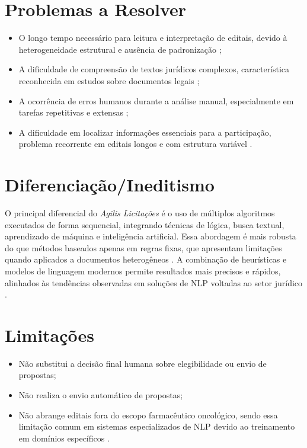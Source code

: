 \section{Problemas a Resolver}

\begin{itemize}
    \item O longo tempo necessário para leitura e interpretação de editais, devido à heterogeneidade estrutural e ausência de padronização \cite{tcu_relatorio_2022};
    \item A dificuldade de compreensão de textos jurídicos complexos, característica reconhecida em estudos sobre documentos legais \cite{chalkidis_legalbert_2020};
    \item A ocorrência de erros humanos durante a análise manual, especialmente em tarefas repetitivas e extensas \cite{kim_rule_based_limitations_2019};
    \item A dificuldade em localizar informações essenciais para a participação, problema recorrente em editais longos e com estrutura variável \cite{tcu_relatorio_2022}.
\end{itemize}


\section{Diferenciação/Ineditismo}

O principal diferencial do \textit{Agilis Licitações} é o uso de múltiplos algoritmos executados de forma sequencial, integrando técnicas de lógica, busca textual, aprendizado de máquina e inteligência artificial. Essa abordagem é mais robusta do que métodos baseados apenas em regras fixas, que apresentam limitações quando aplicados a documentos heterogêneos \cite{kim_rule_based_limitations_2019}. A combinação de heurísticas e modelos de linguagem modernos permite resultados mais precisos e rápidos, alinhados às tendências observadas em soluções de NLP voltadas ao setor jurídico \cite{hendrycks_lexnlp_2020}.


\section{Limitações}

\begin{itemize}
    \item Não substitui a decisão final humana sobre elegibilidade ou envio de propostas;
    \item Não realiza o envio automático de propostas;
    \item Não abrange editais fora do escopo farmacêutico oncológico, sendo essa limitação comum em sistemas especializados de NLP devido ao treinamento em domínios específicos \cite{chalkidis_legalbert_2020}.
\end{itemize}


